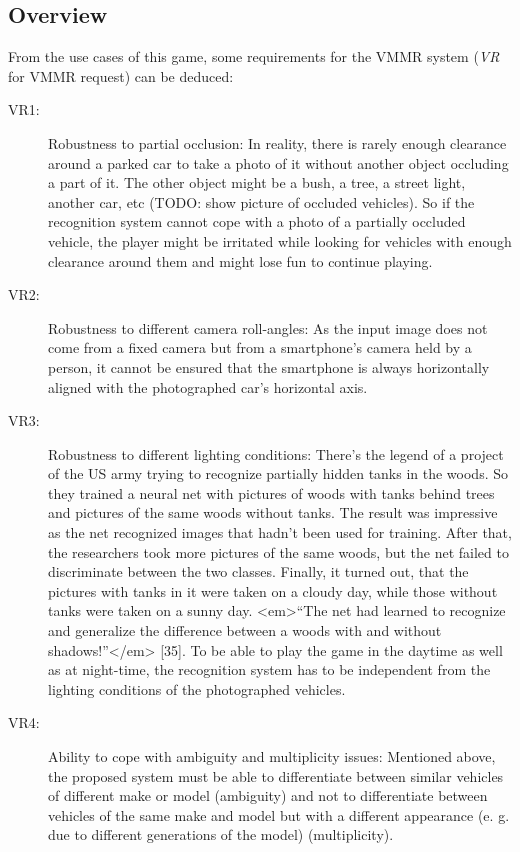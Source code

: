 \subsection{Overview}
From the use cases of this game, some requirements for the VMMR system (\emph{VR} for VMMR request) can be deduced:
\begin{description}
  \item[VR1:] Robustness to partial occlusion: In reality, there is rarely enough clearance around a parked car to take a photo of it without another object occluding a part of it. The other object might be a bush, a tree, a street light, another car, etc (TODO: show picture of occluded vehicles). So if the recognition system cannot cope with a photo of a partially occluded vehicle, the player might be irritated while looking for vehicles with enough clearance around them and might lose fun to continue playing.
  \item[VR2:] Robustness to different camera roll-angles: As the input image does not come from a fixed camera but from a smartphone’s camera held by a person, it cannot be ensured that the smartphone is always horizontally aligned with the photographed car’s horizontal axis.
  \item[VR3:] Robustness to different lighting conditions: There's the legend of a project of the US army trying to recognize partially hidden tanks in the woods. So they trained a neural net with pictures of woods with tanks behind trees and pictures of the same woods without tanks. The result was impressive as the net recognized images that hadn't been used for training. After that, the researchers took more pictures of the same woods, but the net failed to discriminate between the two classes. Finally, it turned out, that the pictures with tanks in it were taken on a cloudy day, while those without tanks were taken on a sunny day. <em>“The net had learned to recognize and generalize the difference between a woods with and without shadows!”</em> [35]. To be able to play the game in the daytime as well as at night-time, the recognition system has to be independent from the lighting conditions of the photographed vehicles.
  \item[VR4:] Ability to cope with ambiguity and multiplicity issues: Mentioned above, the proposed system must be able to differentiate between similar vehicles of different make or model (ambiguity) and not to differentiate between vehicles of the same make and model but with a different appearance (e. g. due to different generations of the model) (multiplicity).
\end{description}

